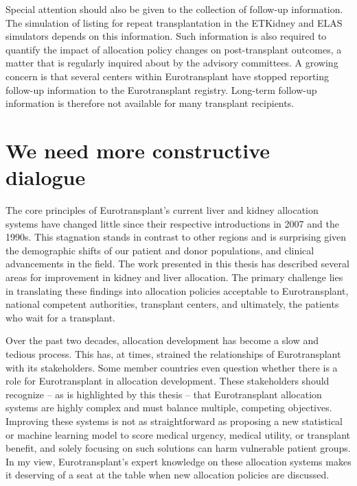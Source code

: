 \documentclass[11pt,twoside,]{book}
\begin{document}
Special attention should also be given to the collection of follow-up
information. The simulation of listing for repeat transplantation in the
ETKidney and ELAS simulators depends on this information. Such information
is also required to quantify the impact of allocation policy changes on post-transplant
outcomes, a matter that is regularly inquired about by the advisory committees.
A growing concern is that several centers within Eurotransplant have stopped
reporting follow-up information to the Eurotransplant registry. Long-term
follow-up information is therefore not available for many transplant
recipients.

\section{We need more constructive dialogue}\label{we-need-more-constructive-dialogue}

The core principles of Eurotransplant's current liver and kidney allocation
systems have changed little since their respective introductions in 2007 and the 1990s.
This stagnation stands in contrast to other regions and is
surprising given the demographic shifts of our patient and donor populations,
and clinical advancements in the field. The work presented in this thesis has
described several areas for improvement in kidney and liver allocation.
The primary challenge lies in translating these findings into
allocation policies acceptable to Eurotransplant, national competent authorities,
transplant centers, and ultimately, the patients who wait for a transplant.

Over the past two decades, allocation development has become a slow and tedious
process. This has, at times, strained the relationships of Eurotransplant with its
stakeholders. Some member countries even question whether there is a role for
Eurotransplant in allocation development. These stakeholders should recognize -- as is
highlighted by this thesis -- that Eurotransplant allocation systems are highly
complex and must balance multiple, competing objectives.
Improving these systems is not as straightforward
as proposing a new statistical or machine learning model to score medical
urgency, medical utility, or transplant benefit, and solely focusing on such
solutions can harm vulnerable patient groups. In my view,
Eurotransplant's expert knowledge on these allocation systems makes it deserving
of a seat at the table when new allocation policies are discussed.
\end{document}
